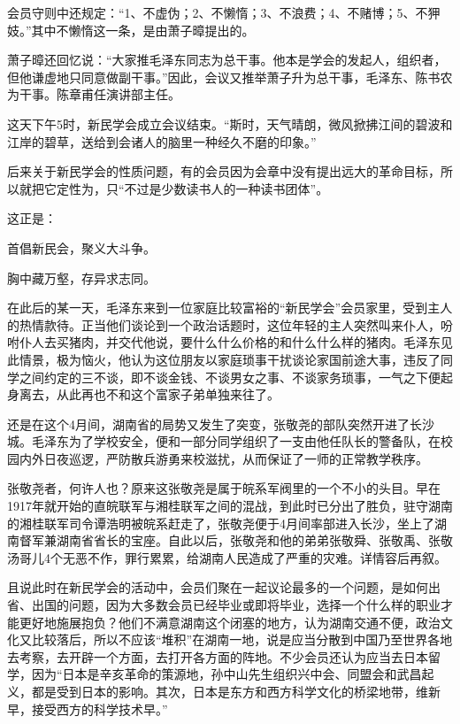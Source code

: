 \documentclass[../../dazhuan.tex]{subfiles}
\begin{document}
会员守则中还规定：“1、不虚伪；2、不懒惰；3、不浪费；4、不赌博；5、不狎妓。”其中不懒惰这一条，是由萧子暲提出的。

萧子暲还回忆说：“大家推毛泽东同志为总干事。他本是学会的发起人，组织者，但他谦虚地只同意做副干事。”因此，会议又推举萧子升为总干事，毛泽东、陈书农为干事。陈章甫任演讲部主任。

这天下午5时，新民学会成立会议结束。“斯时，天气晴朗，微风掀拂江间的碧波和江岸的碧草，送给到会诸人的脑里一种经久不磨的印象。”

后来关于新民学会的性质问题，有的会员因为会章中没有提出远大的革命目标，所以就把它定性为，只“不过是少数读书人的一种读书团体”。

这正是：\begin{xemph}首倡新民会，聚义大斗争。

\hspace{4em}胸中藏万壑，存异求志同。\end{xemph}



在此后的某一天，毛泽东来到一位家庭比较富裕的“新民学会”会员家里，受到主人的热情款待。正当他们谈论到一个政治话题时，这位年轻的主人突然叫来仆人，吩咐仆人去买猪肉，并交代他说，要什么什么价格的和什么什么样的猪肉。毛泽东见此情景，极为恼火，他认为这位朋友以家庭琐事干扰谈论家国前途大事，违反了同学之间约定的三不谈，即不谈金钱、不谈男女之事、不谈家务琐事，一气之下便起身离去，从此再也不和这个富家子弟单独来往了。

还是在这个4月间，湖南省的局势又发生了突变，张敬尧的部队突然开进了长沙城。毛泽东为了学校安全，便和一部分同学组织了一支由他任队长的警备队，在校园内外日夜巡逻，严防散兵游勇来校滋扰，从而保证了一师的正常教学秩序。

张敬尧者，何许人也？原来这张敬尧是属于皖系军阀里的一个不小的头目。早在1917年就开始的直皖联军与湘桂联军之间的混战，到此时已分出了胜负，驻守湖南的湘桂联军司令谭浩明被皖系赶走了，张敬尧便于4月间率部进入长沙，坐上了湖南督军兼湖南省省长的宝座。自此以后，张敬尧和他的弟弟张敬舜、张敬禹、张敬汤哥儿4个无恶不作，罪行累累，给湖南人民造成了严重的灾难。详情容后再叙。

且说此时在新民学会的活动中，会员们聚在一起议论最多的一个问题，是如何出省、出国的问题，因为大多数会员已经毕业或即将毕业，选择一个什么样的职业才能更好地施展抱负？他们不满意湖南这个闭塞的地方，认为湖南交通不便，政治文化又比较落后，所以不应该“堆积”在湖南一地，说是应当分散到中国乃至世界各地去考察，去开辟一个方面，去打开各方面的阵地。不少会员还认为应当去日本留学，因为“日本是辛亥革命的策源地，孙中山先生组织兴中会、同盟会和武昌起义，都是受到日本的影响。其次，日本是东方和西方科学文化的桥梁地带，维新早，接受西方的科学技术早。”
\end{document}
